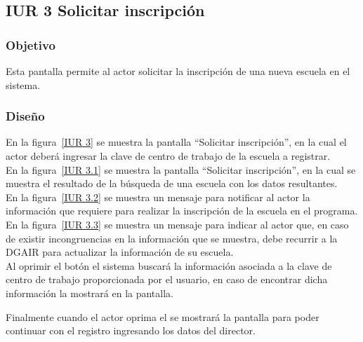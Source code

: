 \subsection{IUR 3 Solicitar inscripción}

\subsubsection{Objetivo}

    Esta pantalla permite al actor  solicitar la inscripción de una nueva escuela en el sistema.

\subsubsection{Diseño}

    En la figura~\ref{IUR 3} se muestra la pantalla ``Solicitar inscripción'', en la cual el actor deberá ingresar la clave de centro de trabajo de la escuela a registrar.\\
    
    En la figura~\ref{IUR 3.1} se muestra la pantalla ``Solicitar inscripción'', en la cual se muestra el resultado de la búsqueda de una escuela con los datos resultantes.\\

   En la figura~\ref{IUR 3.2} se muestra un mensaje para notificar al actor la información que requiere para realizar la inscripción de la escuela en el programa.\\
    
   En la figura~\ref{IUR 3.3} se muestra un mensaje para indicar al actor que, en caso de existir incongruencias en la información que se muestra, debe recurrir a la DGAIR para actualizar la información de su escuela.\\

    Al oprimir el botón \botBus el sistema buscará la información asociada a la clave de centro de trabajo proporcionada por el usuario, en caso de encontrar dicha información la mostrará en la pantalla.
    
    Finalmente cuando el actor oprima el  se mostrará la pantalla  para poder continuar con el registro ingresando los datos del director.
    
    


